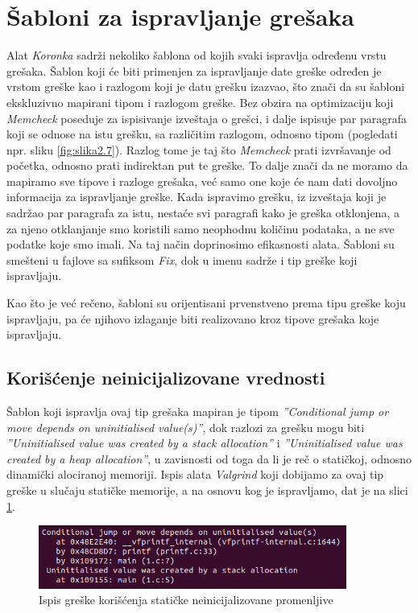 \documentclass[12pt,oneside]{memoir}
\theoremstyle{plain}
\theoremstyle{definition}
\begin{document}
\section{Šabloni za ispravljanje grešaka}
Alat \textit{Koronka} sadrži nekoliko šablona od kojih svaki ispravlja određenu vrstu grešaka. Šablon koji će biti primenjen za ispravljanje date greške određen je vrstom greške kao i razlogom koji je datu grešku izazvao, što znači da su šabloni ekskluzivno mapirani tipom i razlogom greške. Bez obzira na optimizaciju koji \textit{Memcheck} poseduje za ispisivanje izveštaja o grešci, i dalje ispisuje par paragrafa koji se odnose na istu grešku, sa različitim razlogom, odnosno tipom (pogledati npr. sliku \ref{fig:slika2.7}). Razlog tome je taj što \textit{Memcheck} prati izvršavanje od početka, odnosno prati indirektan put te greške. To dalje znači da ne moramo da mapiramo sve tipove i razloge grešaka, već samo one koje će nam dati dovoljno informacija za ispravljanje greške. Kada ispravimo grešku, iz izveštaja koji je sadržao par paragrafa za istu, nestaće svi paragrafi kako je greška otklonjena, a za njeno otklanjanje smo koristili samo neophodnu količinu podataka, a ne sve podatke koje smo imali. Na taj način doprinosimo efikasnosti alata. Šabloni su smešteni u fajlove sa sufiksom \textit{Fix}, dok u imenu sadrže i tip greške koji ispravljaju. 

Kao što je već rečeno, šabloni su orijentisani prvenstveno prema tipu greške koju ispravljaju, pa će njihovo izlaganje biti realizovano kroz tipove grešaka koje ispravljaju. 

\subsection{Korišćenje neinicijalizovane vrednosti}
Šablon koji ispravlja ovaj tip grešaka mapiran je tipom \textit{''Conditional jump or move depends on uninitialised value(s)''}, dok razlozi za grešku mogu biti \textit{''Uninitialised value was created by a stack allocation''} i \textit{''Uninitialised value was created by a heap allocation''}, u zavisnosti od toga da li je reč o statičkoj, odnosno dinamički alociranoj memoriji. Ispis alata \textit{Valgrind} koji dobijamo za ovaj tip greške u slučaju statičke memorije, a na osnovu kog je ispravljamo, dat je na slici \ref{fig:slika4.5}.

\begin{figure}[!ht]
  \centering
  \includegraphics[width=0.9\textwidth]{UninitialisedStatic.png}
  \caption{Ispis greške korišćenja statičke neinicijalizovane promenljive}
  \label{fig:slika4.5}
\end{figure}
\end{document}
